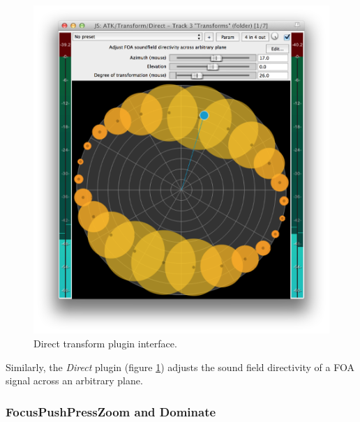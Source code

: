 \documentclass{article}
\begin{document}
\begin{figure}[h]
\captionsetup{aboveskip=-6pt}
\centering
\includegraphics[width=0.9\columnwidth]{figures/directTransform.png}
\caption{Direct transform plugin interface.\label{fig:directTransform}}
\end{figure}

Similarly, the \emph{Direct} plugin (figure \ref{fig:directTransform}) adjusts the sound field directivity of a FOA signal across an arbitrary plane.


 
\subsubsection{FocusPushPressZoom and Dominate}\label{sec:focus}
\end{document}
